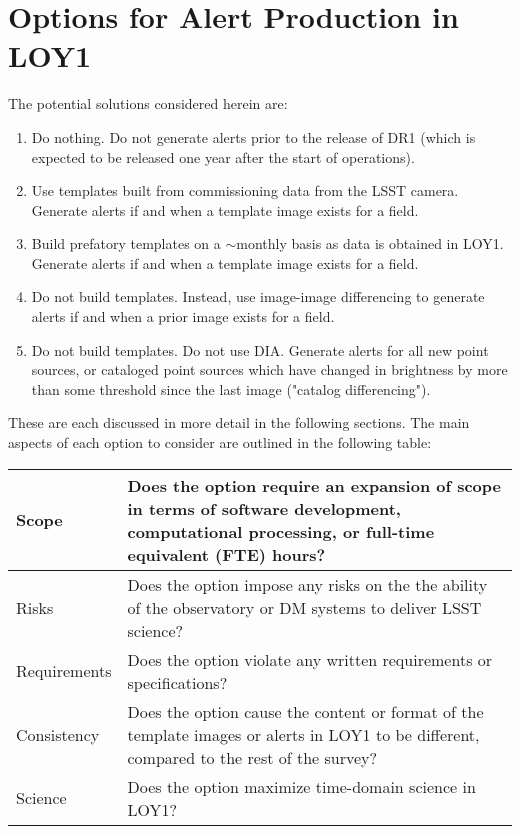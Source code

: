 \documentclass[DM,lsstdraft,toc]{lsstdoc}
\begin{document}
\clearpage
\section{Options for Alert Production in LOY1}\label{sec:potsol}

The potential solutions considered herein are:
\begin{enumerate}
\item Do nothing. Do not generate alerts prior to the release of DR1 (which is expected to be released one year after the start of operations).
\item Use templates built from commissioning data from the LSST camera. Generate alerts if and when a template image exists for a field. 
\item Build prefatory templates on a $\sim$monthly basis as data is obtained in LOY1. Generate alerts if and when a template image exists for a field.
\item Do not build templates. Instead, use image-image differencing to generate alerts if and when a prior image exists for a field.
\item Do not build templates. Do not use DIA. Generate alerts for all new point sources, or cataloged point sources which have changed in brightness by more than some threshold since the last image ("catalog differencing").
\end{enumerate}

These are each discussed in more detail in the following sections.
The main aspects of each option to consider are outlined in the following table:
\begin{center}
\begin{tabular}{|p{2.5cm}|p{13cm}|}
\hline
Scope & Does the option require an expansion of scope in terms of software development, computational processing, or full-time equivalent (FTE) hours? \\
\hline
Risks & Does the option impose any risks on the the ability of the observatory or DM systems to deliver LSST science?  \\
\hline
Requirements & Does the option violate any written requirements or specifications? \\
\hline
Consistency & Does the option cause the content or format of the template images or alerts in LOY1 to be different, compared to the rest of the survey? \\ 
\hline
Science & Does the option maximize time-domain science in LOY1? \\
\hline
\end{tabular}
\end{center} 
\end{document}
